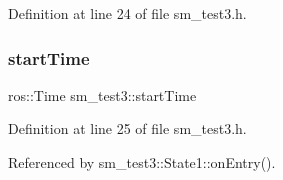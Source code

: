 Definition at line 24 of file sm\+\_\+test3.\+h.

\mbox{\label{namespacesm__test3_a3c530a2f1d2f50afbd4e56e96c1edd83}} 
\subsubsection{\texorpdfstring{start\+Time}{startTime}}
{\footnotesize\ttfamily ros\+::\+Time sm\+\_\+test3\+::start\+Time}



Definition at line 25 of file sm\+\_\+test3.\+h.



Referenced by sm\+\_\+test3\+::\+State1\+::on\+Entry().

